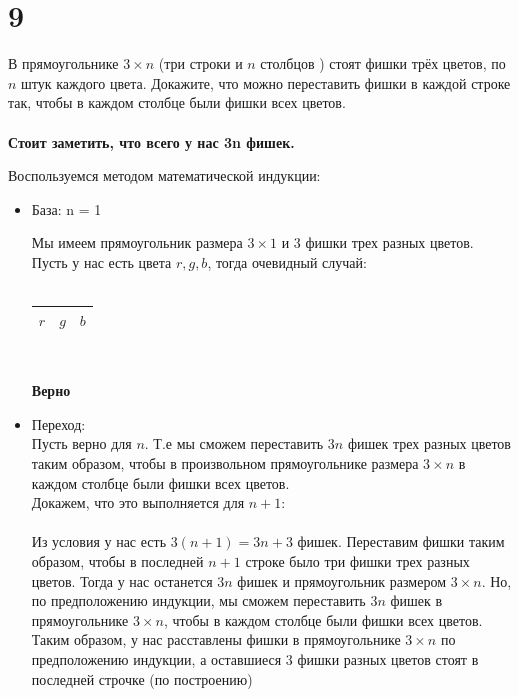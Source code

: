 \documentclass[a4paper,12pt]{article}
\begin{document}
\section*{9}
В прямоугольнике $3 \times n$ (три строки и $n$ столбцов ) стоят фишки трёх цветов, по $ n $ штук каждого цвета. Докажите, что можно переставить фишки в каждой строке так, чтобы в каждом столбце были фишки всех цветов.\\\\
\textbf{Стоит заметить, что всего у нас 3n фишек.}\\
\begin{center}
Воспользуемся методом математической индукции:
\end{center}
\begin{itemize}
\item База: n = 1

Мы имеем прямоугольник размера $3 \times 1 $ и 3 фишки трех разных цветов. Пусть у нас есть цвета $r, g, b$, тогда очевидный случай:\\\\
\begin{tabular}{|c|c|c|}
\hline
 $r$ & $g $ &  $ b $\\
\hline
\end{tabular}\\
\begin{center}
\textbf{Верно}
\end{center}

\item Переход:\\

Пусть верно для $n$. Т.е мы сможем переставить $3n$ фишек трех разных цветов таким образом, чтобы в произвольном прямоугольнике размера $3\times n$  в каждом столбце были фишки всех цветов.\\
\newpage
Докажем, что это выполняется для $n+1$:\\\\
Из условия у нас есть $3(n+1) = 3n + 3$ фишек. Переставим фишки таким образом, чтобы в последней $n+1$ строке было три фишки трех разных цветов. Тогда у нас останется $3n$ фишек и прямоугольник размером $3\times n$. Но, по предположению индукции, мы сможем переставить $3n$ фишек в прямоугольнике $3 \times n$, чтобы в каждом столбце были фишки всех цветов. Таким образом, у нас расставлены фишки в прямоугольнике $ 3 \times n $ по предположению индукции, а оставшиеся 3 фишки разных цветов стоят в последней строчке (по построению)

\end{itemize}
\end{document}
